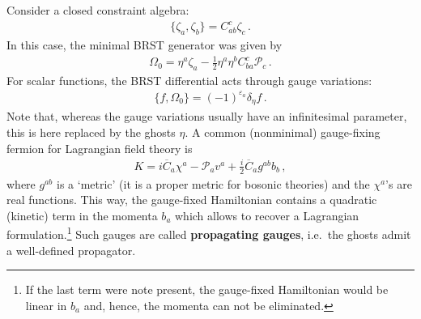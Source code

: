     Consider a closed constraint algebra:
    \begin{gather}
        \{\zeta_a,\zeta_b\}=C^c_{ab}\zeta_c\,.
    \end{gather}
    In this case, the minimal BRST generator was given by
    \begin{gather}
        \Omega_0 = \eta^a\zeta_a - \frac{1}{2}\eta^a\eta^b C^c_{ba}\mathcal{P}_c\,.
    \end{gather}
    For scalar functions, the BRST differential acts through gauge variations:
    \begin{gather}
        \{f,\Omega_0\} = (-1)^{\varepsilon_a}\delta_\eta f\,.
    \end{gather}
    Note that, whereas the gauge variations usually have an infinitesimal parameter, this is here replaced by the ghosts $\eta$. A common (nonminimal) gauge-fixing fermion for Lagrangian field theory is
    \begin{gather}
        K = i\overline{C}_a\chi^a - \mathcal{P}_av^a + \frac{i}{2}\overline{C}_ag^{ab}b_b\,,
    \end{gather}
    where $g^{ab}$ is a `metric' (it is a proper metric for bosonic theories) and the $\chi^a$'s are real functions. This way, the gauge-fixed Hamiltonian contains a quadratic (kinetic) term in the momenta $b_a$ which allows to recover a Lagrangian formulation.\footnote{If the last term were note present, the gauge-fixed Hamiltonian would be linear in $b_a$ and, hence, the momenta can not be eliminated.} Such gauges are called \textbf{propagating gauges}, i.e.~the ghosts admit a well-defined propagator.

